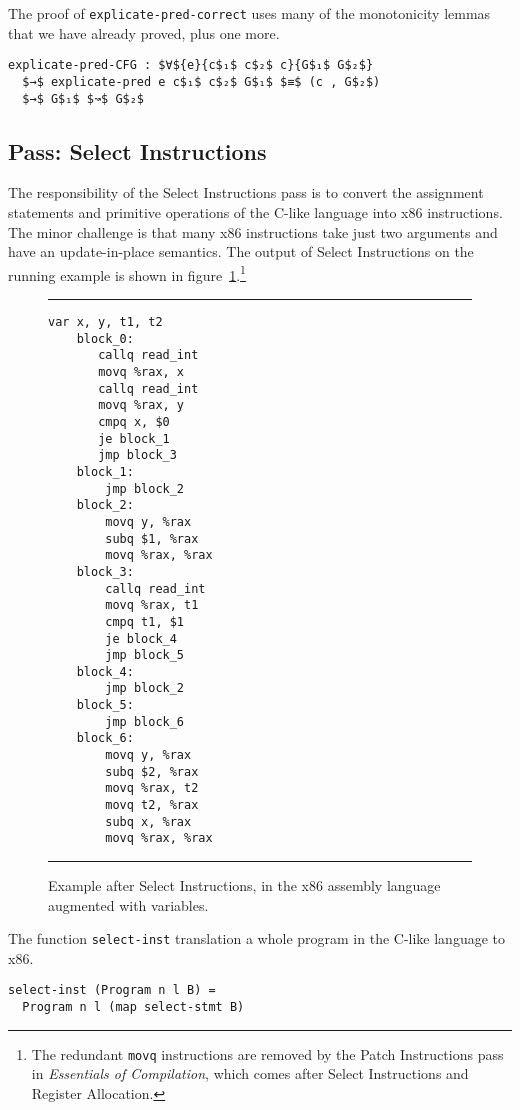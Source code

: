 \documentclass[sigplan,review,dvipsnames,screen,10pt]{acmart}
\begin{document}
The proof of \lstinline{explicate-pred-correct} uses many of the
monotonicity lemmas that we have already proved, plus one more.

\begin{lstlisting}
explicate-pred-CFG : $∀${e}{c$₁$ c$₂$ c}{G$₁$ G$₂$}
  $→$ explicate-pred e c$₁$ c$₂$ G$₁$ $≡$ (c , G$₂$)
  $→$ G$₁$ $↝$ G$₂$
\end{lstlisting}

\subsection{Pass: Select Instructions}

The responsibility of the Select Instructions pass is to convert the
assignment statements and primitive operations of the C-like language
into x86 instructions. The minor challenge is that many x86
instructions take just two arguments and have an update-in-place
semantics. The output of Select Instructions on the running example is
shown in figure~\ref{fig:running-example-x86}.\footnote{The redundant
\texttt{movq} instructions are removed by the Patch Instructions pass
in \emph{Essentials of Compilation}, which comes after Select
Instructions and Register Allocation.}

\begin{figure}[tp]
  \hrule
\begin{lstlisting}[mathescape=false]
    var x, y, t1, t2
    block_0:
       callq read_int
       movq %rax, x
       callq read_int
       movq %rax, y
       cmpq x, $0
       je block_1
       jmp block_3
    block_1:
        jmp block_2
    block_2:
        movq y, %rax
        subq $1, %rax
        movq %rax, %rax
    block_3:
        callq read_int
        movq %rax, t1
        cmpq t1, $1
        je block_4
        jmp block_5
    block_4:
        jmp block_2
    block_5:
        jmp block_6
    block_6:
        movq y, %rax
        subq $2, %rax
        movq %rax, t2
        movq t2, %rax
        subq x, %rax
        movq %rax, %rax
\end{lstlisting}
  \hrule
  \caption{Example after Select Instructions, in the x86 assembly language
    augmented with variables.}
\label{fig:running-example-x86}
\end{figure}

The function \lstinline{select-inst} translation a whole program in
the C-like language to x86.
\begin{lstlisting}
select-inst (Program n l B) =
  Program n l (map select-stmt B)
\end{lstlisting}
\end{document}
